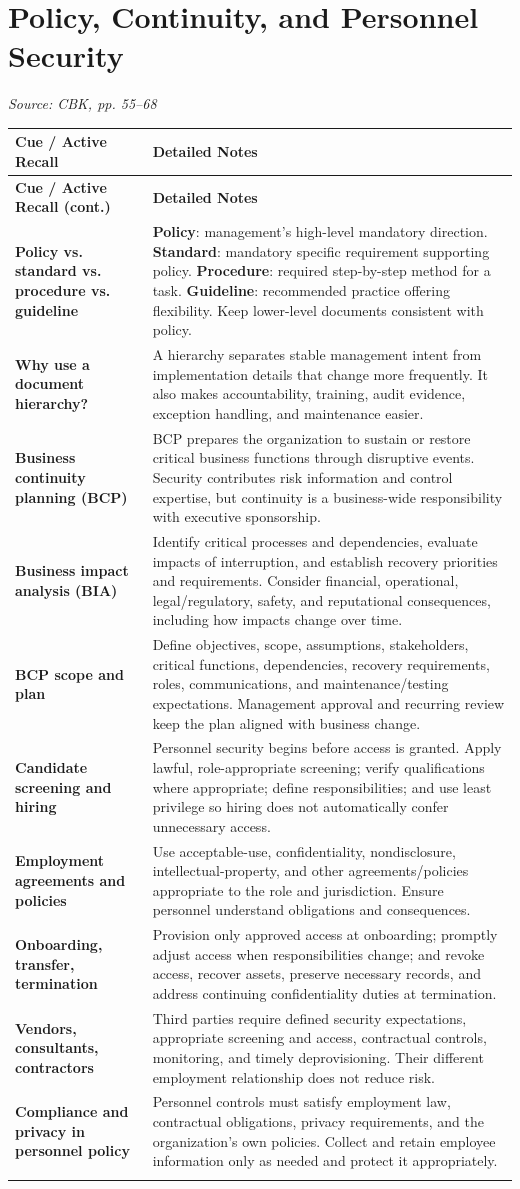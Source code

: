 \documentclass[10pt,letterpaper]{article}
\makeatletter
\newenvironment{cornell}
{\rowcolors{2}{white}{notebg}\begin{longtable}{@{}>{\raggedright\arraybackslash\columncolor{cuebg}\color{navy}\bfseries}p{0.285\textwidth}>{\raggedright\arraybackslash}p{0.65\textwidth}@{}}
\rowcolor{navy}\color{white}\textbf{Cue / Active Recall} & \color{white}\textbf{Detailed Notes}\\ \hline
\endfirsthead
\rowcolor{navy}\color{white}\textbf{Cue / Active Recall (cont.)} & \color{white}\textbf{Detailed Notes}\\ \hline
\endhead}
{\end{longtable}}
\newcommand{\noterow}[2]{#1 & #2\\\arrayrulecolor{line}\hline}
\newcommand{\source}[1]{\par{\footnotesize\color{teal}\textit{Source: CBK, #1}}\par}
\makeatother
\begin{document}
\section{\color{navy}Policy, Continuity, and Personnel Security}
\source{pp. 55--68}
\begin{cornell}
\noterow{Policy vs. standard vs. procedure vs. guideline}{\textbf{Policy}: management's high-level mandatory direction. \textbf{Standard}: mandatory specific requirement supporting policy. \textbf{Procedure}: required step-by-step method for a task. \textbf{Guideline}: recommended practice offering flexibility. Keep lower-level documents consistent with policy.}
\noterow{Why use a document hierarchy?}{A hierarchy separates stable management intent from implementation details that change more frequently. It also makes accountability, training, audit evidence, exception handling, and maintenance easier.}
\noterow{Business continuity planning (BCP)}{BCP prepares the organization to sustain or restore critical business functions through disruptive events. Security contributes risk information and control expertise, but continuity is a business-wide responsibility with executive sponsorship.}
\noterow{Business impact analysis (BIA)}{Identify critical processes and dependencies, evaluate impacts of interruption, and establish recovery priorities and requirements. Consider financial, operational, legal/regulatory, safety, and reputational consequences, including how impacts change over time.}
\noterow{BCP scope and plan}{Define objectives, scope, assumptions, stakeholders, critical functions, dependencies, recovery requirements, roles, communications, and maintenance/testing expectations. Management approval and recurring review keep the plan aligned with business change.}
\noterow{Candidate screening and hiring}{Personnel security begins before access is granted. Apply lawful, role-appropriate screening; verify qualifications where appropriate; define responsibilities; and use least privilege so hiring does not automatically confer unnecessary access.}
\noterow{Employment agreements and policies}{Use acceptable-use, confidentiality, nondisclosure, intellectual-property, and other agreements/policies appropriate to the role and jurisdiction. Ensure personnel understand obligations and consequences.}
\noterow{Onboarding, transfer, termination}{Provision only approved access at onboarding; promptly adjust access when responsibilities change; and revoke access, recover assets, preserve necessary records, and address continuing confidentiality duties at termination.}
\noterow{Vendors, consultants, contractors}{Third parties require defined security expectations, appropriate screening and access, contractual controls, monitoring, and timely deprovisioning. Their different employment relationship does not reduce risk.}
\noterow{Compliance and privacy in personnel policy}{Personnel controls must satisfy employment law, contractual obligations, privacy requirements, and the organization's own policies. Collect and retain employee information only as needed and protect it appropriately.}
\end{cornell}
\end{document}
